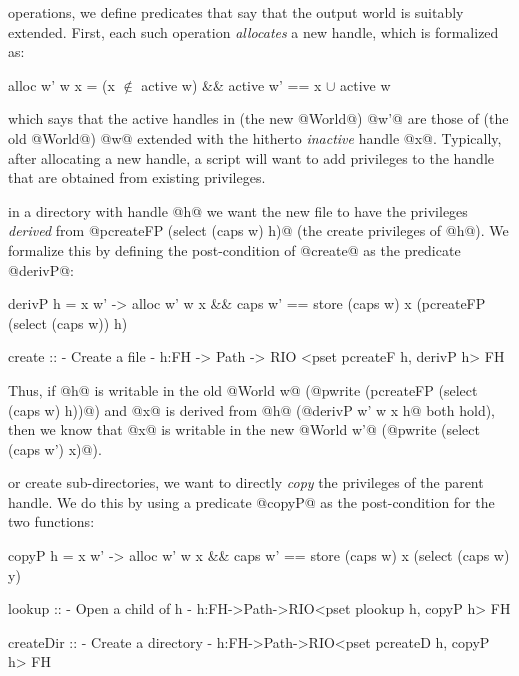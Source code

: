  operations, we define 
predicates that say that the output world is suitably 
extended. First, each such operation \emph{allocates} 
a new handle, which is formalized as:
%
\begin{mcode}
  alloc w' w x = (x $\not \in$ active w) && active w' == {x} $\cup$ active w
\end{mcode}
%
which says that the active handles in (the new @World@) 
@w'@ are those of (the old @World@) @w@ extended with the
hitherto \emph{inactive} handle @x@.
%
Typically, after allocating a new handle, a script will
want to add privileges to the handle that are obtained
from existing privileges.

 in a directory with handle @h@ we
want the new file to have the privileges \emph{derived} from
@pcreateFP (select (caps w) h)@ (\ie the create privileges of @h@). We
formalize this by defining the post-condition of @create@ as the predicate @derivP@:
%
\begin{code}
  derivP h  = \w x w' -> 
    alloc w' w x && 
    caps w' == store (caps w) x (pcreateFP (select (caps w)) h)

  create :: {- Create a file -}
    h:FH -> Path -> RIO <pset pcreateF h, derivP h> FH
\end{code}
%
Thus, if @h@ is writable in the old @World w@ 
(@pwrite (pcreateFP (select (caps w) h))@) and
@x@ is derived from @h@ (@derivP w' w x h@ both hold),
then we know that @x@ is writable in the new @World w'@
(@pwrite (select (caps w') x)@).

 or create sub-directories,
we want to directly \emph{copy} the privileges of the parent handle. 
We do this by using a predicate @copyP@ as the post-condition for 
the two functions:
%
\begin{code}
  copyP h = \w x w' ->
    alloc w' w x && 
    caps w' == store (caps w) x 
                     (select (caps w) y)

  lookup :: {- Open a child of h -}
    h:FH->Path->RIO<pset plookup h, copyP h> FH

  createDir :: {- Create a directory -}
    h:FH->Path->RIO<pset pcreateD h, copyP h> FH
\end{code}
  
